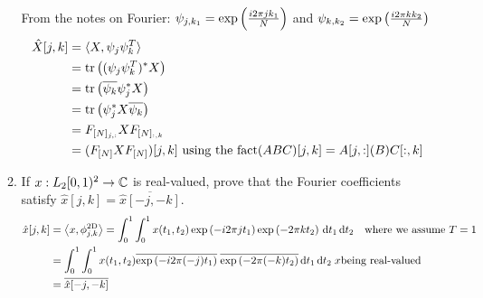 \documentclass[12pt,twoside]{article}
\begin{document}
\begin{enumerate}
\begin{enumerate}
    From the notes on Fourier: $\psi_{j, k_1} = \exp \left(  \frac{ i2 \pi j k_1}{N}  \right)$  and  $\psi_{k, k_2} = \exp \left(  \frac{ i2 \pi k k_2}{N}  \right)$
    \begin{align*}
    	\hat{X}[j,k] 	&=	 \langle X,\psi_j\psi_k^T\rangle \\
				&=	\operatorname{tr}\left(  (\psi_j\psi_k^T)^*  X \right)\\
				&=	\operatorname{tr}\left( \overline{\psi_k} \psi_j^* X \right) \\
				&= 	\operatorname{tr}\left( \psi_j^* X \overline{\psi_k} \right) \\
				&= 	F_{[N]_{j,:}} X F_{[N]_{:,k}} \\ 
				&= 	(F_{[N]}XF_{[N]})[j,k] \text{ using the fact} (ABC)[j,k] = A[j,:](B)C[:,k] \\
    \end{align*}
    
  \item If $x:L_2[0,1)^2\to\mathbb{C}$ is real-valued, prove that the Fourier
    coefficients satisfy $\hat{x}[j,k]=\overline{\hat{x}[-j,-k]}$.\\
\begin{align*}
   	\hat{x}[j,k]	   	&= \left \langle x, \phi_{j,k}^{\text{2D}}\right \rangle = \int_0^1 \int_0^1 x(t_1, t_2) \exp \left( - i2 \pi j t_1  \right)  \exp \left( - 2 \pi k t_2  \right) \, \text{d}t_1 \, \text{d}t_2 \text{ ~ where we assume } T = 1\\ 	
				&=   \int_0^1 \int_0^1 x(t_1, t_2) \overline{\exp \left( - i2 \pi (-j) t_1  \right)}  \;  \overline{\exp \left( - 2 \pi (-k) t_2  \right)} \, \text{d}t_1 \, \text{d}t_2 \; x \text{being real-valued}\\
				&= \overline{\hat{x}[-j,-k]} \\
\end{align*}
   
  \end{enumerate}
  

\end{enumerate}
\end{document}
